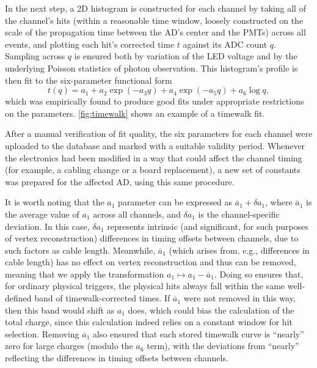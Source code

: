 \documentclass[../thesis.tex]{subfiles}
\begin{document}
In the next step, a 2D histogram is constructed for each channel by taking all of the channel's hits (within a reasonable time window, loosely constructed on the scale of the propagation time between the AD's center and the PMTs) across all events, and plotting each hit's corrected time $t$ against its ADC count $q$. Sampling across $q$ is ensured both by variation of the LED voltage and by the underlying Poisson statistics of photon observation. This histogram's profile is then fit to the six-parameter functional form
\begin{equation*}
  t(q) = a_1 + a_2 \exp (-a_3 q) + a_4 \exp (-a_5 q) + a_6 \log q,
\end{equation*}
which was empirically found to produce good fits under appropriate restrictions on the parameters. \autoref{fig:timewalk} shows an example of a timewalk fit.

After a manual verification of fit quality, the six parameters for each channel were uploaded to the database and marked with a suitable validity period. Whenever the electronics had been modified in a way that could affect the channel timing (for example, a cabling change or a board replacement), a new set of constants was prepared for the affected AD, using this same procedure.

It is worth noting that the $a_1$ parameter can be expressed as $\overline a_1 + \delta a_1$, where $\overline a_1$ is the average value of $a_1$ across all channels, and $\delta a_1$ is the channel-specific deviation. In this case, $\delta a_1$ represents intrinsic (and significant, for such purposes of vertex reconstruction) differences in timing offsets between channels, due to such factors as cable length. Meanwhile, $\overline a_1$ (which arises from, e.g., differences in cable length) has no effect on vertex reconstruction and thus can be removed, meaning that we apply the transformation $a_1 \mapsto a_1 - \overline a_1$. Doing so ensures that, for ordinary physical triggers, the physical hits always fall within the same well-defined band of timewalk-corrected times. If $\overline a_1$ were not removed in this way, then this band would shift as $a_1$ does, which could bias the calculation of the total charge, since this calculation indeed relies on a constant window for hit selection. Removing $\overline a_1$ also ensured that each stored timewalk curve is ``nearly'' zero for large charges (modulo the $a_6$ term), with the deviations from ``nearly'' reflecting the differences in timing offsets between channels.
\end{document}
